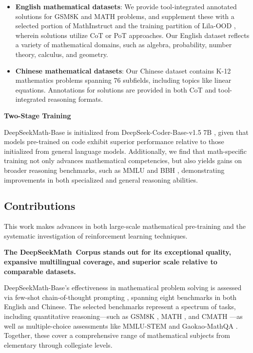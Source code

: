 \begin{itemize}[topsep=0pt]
    \item \textbf{English mathematical datasets}: We provide tool-integrated annotated solutions for GSM8K and MATH problems, and supplement these with a selected portion of MathInstruct \citep{MathInstruct} and the training partition of Lila-OOD \citep{lila}, wherein solutions utilize CoT or PoT approaches. Our English dataset reflects a variety of mathematical domains, such as algebra, probability, number theory, calculus, and geometry.
    \item \textbf{Chinese mathematical datasets}: Our Chinese dataset contains K-12 mathematics problems spanning 76 subfields, including topics like linear equations. Annotations for solutions are provided in both CoT and tool-integrated reasoning formats.
\end{itemize}

\textbf{Two-Stage Training}

DeepSeekMath-Base is initialized from DeepSeek-Coder-Base-v1.5 7B \citep{deepseek-coder}, given that models pre-trained on code exhibit superior performance relative to those initialized from general language models. Additionally, we find that math-specific training not only advances mathematical competencies, but also yields gains on broader reasoning benchmarks, such as MMLU \citep{mmlu} and BBH \citep{bbh}, demonstrating improvements in both specialized and general reasoning abilities.

\subsection{Contributions}
This work makes advances in both large-scale mathematical pre-training and the systematic investigation of reinforcement learning techniques.

\textbf{The DeepSeekMath~Corpus stands out for its exceptional quality, expansive multilingual coverage, and superior scale relative to comparable datasets.}

DeepSeekMath-Base's effectiveness in mathematical problem solving is assessed via few-shot chain-of-thought prompting \citep{cot}, spanning eight benchmarks in both English and Chinese. The selected benchmarks represent a spectrum of tasks, including quantitative reasoning—such as GSM8K \citep{gsm8k}, MATH \citep{MATH}, and CMATH \citep{wei2023cmath}—as well as multiple-choice assessments like MMLU-STEM \citep{mmlu} and Gaokao-MathQA \citep{agieval}. Together, these cover a comprehensive range of mathematical subjects from elementary through collegiate levels.

